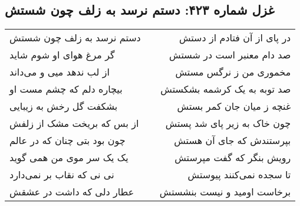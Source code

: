 \begin{center}
\section*{غزل شماره ۴۲۳: دستم نرسد به زلف چون شستش}
\label{sec:423}
\begin{longtable}{l p{0.5cm} r}
دستم نرسد به زلف چون شستش
&&
در پای از آن فتادم از دستش
\\
گر مرغ هوای او شوم شاید
&&
صد دام معنبر است در شستش
\\
از لب ندهد میی و می‌داند
&&
مخموری من ز نرگس مستش
\\
بیچاره دلم که چشم مست او
&&
صد توبه به یک کرشمه بشکستش
\\
بشکفت گل رخش به زیبایی
&&
غنچه ز میان جان کمر بستش
\\
از بس که بریخت مشک از زلفش
&&
چون خاک به زیر پای شد پستش
\\
چون بود بتی چنان که در عالم
&&
بپرستندش که جای آن هستش
\\
یک یک سر موی من همی گوید
&&
رویش بنگر که گفت مپرستش
\\
نی نی که نقاب بر نمی‌دارد
&&
تا سجده نمی‌کنند پیوستش
\\
عطار دلی که داشت در عشقش
&&
برخاست اومید و نیست بنشستش
\\
\end{longtable}
\end{center}
